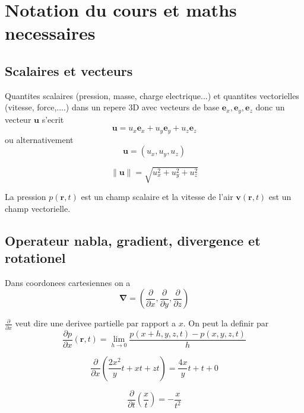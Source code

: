 \chapter{Notation du cours et maths necessaires}

\section{Scalaires et vecteurs}

Quantites scalaires (pression, masse, charge electrique...) et quantites vectorielles (vitesse, force,....) dans un repere 3D avec vecteurs de base $\boldsymbol{e}_{x},\boldsymbol{e}_{y},\boldsymbol{e}_{z}$ donc un vecteur $\boldsymbol{u}$ s'ecrit
$$
\boldsymbol{u}=u_{x}\boldsymbol{e}_{x}+u_{y}\boldsymbol{e}_{y}+u_{z}\boldsymbol{e}_{z}
$$
ou alternativement 
$$
\boldsymbol{u}=(u_{x},u_{y},u_{z})
$$
\begin{definition}
$$
\lVert \boldsymbol{u} \rVert =\sqrt{ u^{2}_{x}+u^{2}_{y}+u^{2}_{z} }
$$
\end{definition}
\begin{example}
La pression $p(\boldsymbol{r},t)$ est un champ scalaire et la vitesse de l'air $\boldsymbol{v}(\boldsymbol{r},t)$ est un champ vectorielle.
\end{example}

\section{Operateur nabla, gradient, divergence et rotationel}

\begin{definition}
Dans coordonees cartesiennes on a
$$
\boldsymbol{\nabla }=\left( \frac{ \partial  }{ \partial x } ,\frac{ \partial }{ \partial y },\frac{ \partial  }{ \partial z }   \right)
$$
\end{definition}
\begin{remark}
$\frac{ \partial  }{ \partial x }$ veut dire une derivee partielle par rapport a $x$. On peut la definir par
$$
\frac{ \partial p }{ \partial x } (\boldsymbol{r},t)=\lim_{ h \to 0 } \frac{p(x+h,y,z,t)-p(x,y,z,t)}{h} 
$$
\end{remark}
\begin{example}
$$
\frac{ \partial  }{ \partial x } \left( \frac{2x^{2}}{y}t+xt+zt \right)=\frac{4x}{y}t+t+0
$$
\end{example}
\begin{example}
$$\frac{ \partial  }{ \partial t }\left( \frac{x}{t} \right)=-\frac{x}{t^{2}}$$
\end{example}

